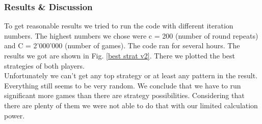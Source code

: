 \documentclass[11pt]{article}
\begin{document}
\subsubsection{Results \& Discussion}
To get reasonable results we tried to run the code with different iteration numbers. The highest numbers we chose were c = 200 (number of round repeats) and C = 2'000'000 (number of games). The code ran for several hours. The results we got are shown in Fig. \ref{best strat v2}. There we plotted the best strategies of both players. \\
Unfortunately we can't get any top strategy or at least any pattern in the result. Everything still seems to be very random. We conclude that we have to run significant more games than there are strategy possibilities. Considering that there are plenty of them we were not able to do that with our limited calculation power.
\end{document}
